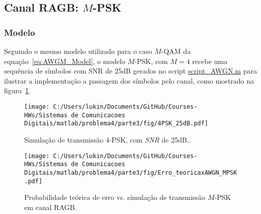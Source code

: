 \clearpage

\subsection{Canal RAGB: \texorpdfstring{$M$}{M}-PSK}
\subsubsection{Modelo}


Seguindo o mesmo modelo utilizado para o caso $M$-QAM da equação~\ref{eq:AWGM_Model}, o modelo $M$-PSK, com $M = 4$ recebe uma sequência de símbolos com SNR de 25dB gerados no script \href{https://raw.githubusercontent.com/lucasabdalah/Courses-HWs/SCD/Sistemas%20de%20Comunicacoes%20Digitais/matlab/problema4/parte3/script_AWGN.m}{\colorbox{gray!10}{\color{red} script\_AWGN.m}} para ilustrar a implementação a passagem dos símbolos pelo canal, como mostrado na figura~\ref{fig:4PSK_25dB}.

\begin{figure}[!ht]
    \centering
    \texttt{[image: C:/Users/lukin/Documents/GitHub/Courses-HWs/Sistemas de Comunicacoes Digitais/matlab/problema4/parte3/fig/4PSK\_25dB.pdf]}
    \caption{Simulação de transmissão $4$-PSK, com \textit{SNR} de 25dB..}
    \label{fig:4PSK_25dB}
\end{figure}

\begin{figure}[!ht]
    \centering
    \texttt{[image: C:/Users/lukin/Documents/GitHub/Courses-HWs/Sistemas de Comunicacoes Digitais/matlab/problema4/parte3/fig/Erro\_teoricaxAWGN\_MPSK.pdf]}
    \caption{Probabilidade teórica de erro vs. simulação de transmissão $M$-PSK em canal RAGB.}
    \label{fig:Erro_teoricaxAWGN_MPSK}
\end{figure}
